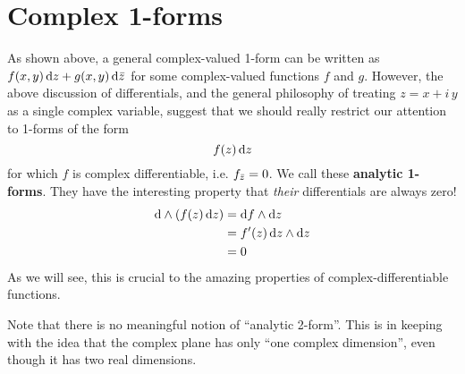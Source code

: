 \documentclass[12pt]{amsart}
\begin{document}
\section{Complex 1-forms}
\label{sec:complex-1-forms}

As shown above, a general complex-valued 1-form can be written as $f(x,y) \,{\mathrm{d} z} + g(x,y)\,{\mathrm{d} \bar{z}}$ for some complex-valued functions $f$ and $g$.
However, the above discussion of differentials, and the general philosophy of treating $z=x+i\,y$ as a single complex variable, suggest that we should really restrict our attention to 1-forms of the form
\[ f(z)\,{\mathrm{d} z} \]
for which $f$ is complex differentiable, i.e. ${f}_{\bar{z}} = 0$.
We call these \textbf{analytic 1-forms}.
They have the interesting property that \emph{their} differentials are always zero!
\begin{align*}
  \mathrm{d}\wedge(f(z)\,{\mathrm{d} z}) &= {\mathrm{d} f} \wedge {\ensuremath{\mathrm{d} z}}\\
  &= f'(z)\, {\mathrm{d} z} \wedge {\ensuremath{\mathrm{d} z}}\\
  &= 0
\end{align*}
As we will see, this is crucial to the amazing properties of complex-differentiable functions.

Note that there is no meaningful notion of ``analytic 2-form''.
This is in keeping with the idea that the complex plane has only ``one complex dimension'', even though it has two real dimensions.
\end{document}
